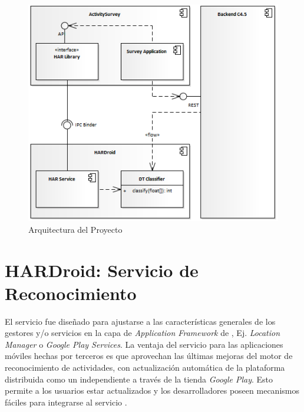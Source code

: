 \begin{figure}[H]
\begin{centering}
\includegraphics[width=0.8\columnwidth]{capitulo-5/graphics/arqui_general}
\par\end{centering}
\caption[Arquitectura del Proyecto]{\label{fig5:arqui-general}Arquitectura del Proyecto}

\end{figure}


\section{HARDroid: Servicio de Reconocimiento}

\label{sec54:hardroid}El servicio  fue diseñado para
ajustarse a las características generales de los gestores y/o servicios
en la capa de \emph{Application Framework} de , Ej.
\emph{Location Manager} o \emph{Google Play Services}. La ventaja
del servicio  para las aplicaciones móviles hechas
por terceros es que aprovechan las últimas mejoras del motor de reconocimiento
de actividades, con actualización automática de la plataforma distribuida
como un  independiente a través de la tienda \emph{Google
Play}. Esto permite a los usuarios estar actualizados y los desarrolladores
poseen mecanismos fáciles para integrarse al servicio .

